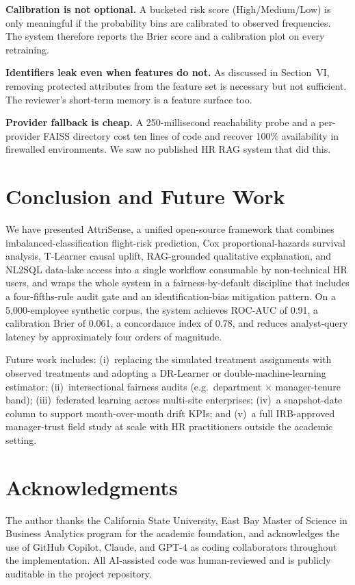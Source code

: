 \documentclass[conference]{IEEEtran}
\begin{document}
\textbf{Calibration is not optional.} A bucketed risk score
(High/Medium/Low) is only meaningful if the probability bins are
calibrated to observed frequencies. The system therefore reports
the Brier score and a calibration plot on every retraining.

\textbf{Identifiers leak even when features do not.} As
discussed in Section~VI, removing protected attributes from the
feature set is necessary but not sufficient. The reviewer's
short-term memory is a feature surface too.

\textbf{Provider fallback is cheap.} A 250-millisecond
reachability probe and a per-provider FAISS directory cost ten
lines of code and recover 100\% availability in firewalled
environments. We saw no published HR RAG system that did this.

\section{Conclusion and Future Work}
We have presented AttriSense, a unified open-source framework
that combines imbalanced-classification flight-risk prediction,
Cox proportional-hazards survival analysis, T-Learner causal
uplift, RAG-grounded qualitative explanation, and NL2SQL
data-lake access into a single workflow consumable by
non-technical HR users, and wraps the whole system in a
fairness-by-default discipline that includes a four-fifths-rule
audit gate and an identification-bias mitigation pattern. On a
5{,}000-employee synthetic corpus, the system achieves ROC-AUC
of 0.91, a calibration Brier of 0.061, a concordance index of
0.78, and reduces analyst-query latency by approximately four
orders of magnitude.

Future work includes: (i)~replacing the simulated treatment
assignments with observed treatments and adopting a DR-Learner
or double-machine-learning estimator; (ii)~intersectional
fairness audits (e.g.\ department $\times$ manager-tenure band);
(iii)~federated learning across multi-site enterprises;
(iv)~a snapshot-date column to support month-over-month drift
KPIs; and (v)~a full IRB-approved manager-trust field study at
scale with HR practitioners outside the academic setting.

\section*{Acknowledgments}
The author thanks the California State University, East Bay
Master of Science in Business Analytics program for the academic
foundation, and acknowledges the use of GitHub Copilot, Claude,
and GPT-4 as coding collaborators throughout the implementation.
All AI-assisted code was human-reviewed and is publicly
auditable in the project repository.
\end{document}
